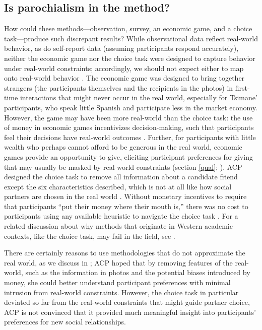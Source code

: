 \documentclass[bibauthoryear]{aa}
\begin{document}
	\subsection{Is parochialism in the method?}
How could these methods---observation, survey, an economic game, and a choice task---produce such discrepant results? While observational data reflect real-world behavior, as do self-report data (assuming participants respond accurately), neither the economic game nor the choice task were designed to capture behavior under real-world constraints; accordingly, we should not expect either to map onto real-world behavior  \citep{Pisor2020, gurven2008collective}. The economic game was designed to bring together strangers (the participants themselves and the recipients in the photos) in first-time interactions that might never occur in the real world, especially for Tsimane' participants, who speak little Spanish and participate less in the market economy. However, the game may have been more real-world than the choice task: the use of money in economic games incentivizes decision-making, such that participants feel their decisions have real-world outcomes \citep{guala2005methodology}. Further, for participants with little wealth who perhaps cannot afford to be generous in the real world, economic games provide an opportunity to give, eliciting participant preferences for giving that may usually be masked by real-world constraints (section \ref{qual}; \citep{Pisor2020}). ACP designed the choice task to remove all information about a candidate friend except the six characteristics described, which is not at all like how social partners are chosen in the real world \citep[see][for a relevant review]{barclay2013strategies}. Without monetary incentives to require that participants ``put their money where their mouth is,'' there was no cost to participants using any available  heuristic to navigate the choice task \citep{Pisor2020, xygalatasreligious}. For a related discussion about why methods that originate in Western academic contexts, like the choice task, may fail in the field, see \citet{hruschka2018learning}.

There are certainly reasons to use methodologies that do not approximate the real world, as we discuss in \citet{Pisor2020}; ACP hoped that by removing features of the real-world, such as the information in photos and the potential biases introduced by money, she could better understand participant preferences with minimal intrusion from real-world constraints. However, the choice task in particular deviated so far from the real-world constraints that might guide partner choice, ACP is not convinced that it provided much meaningful insight into participants' preferences for new social relationships.
\end{document}
